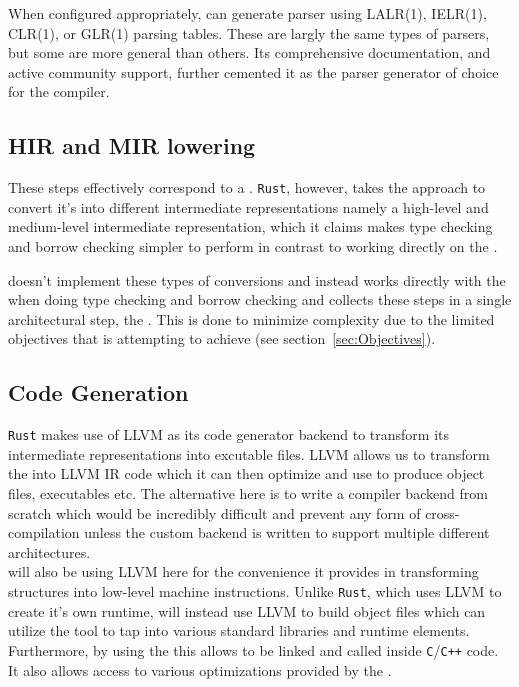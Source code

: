 When configured appropriately, \parserGen{} can generate parser using LALR(1),
IELR(1), CLR(1), or GLR(1) parsing tables. These are largly the
same types of parsers, but some are more general than others. Its comprehensive
documentation, and active community support, further cemented it as the
parser generator of choice for the \lang{} compiler.

\subsection{HIR and MIR lowering}
\label{sec:hirmir}

These steps effectively correspond to a \static{}. \texttt{Rust}, however, takes the approach
to convert it's \ast{} into different intermediate representations namely a
high-level and medium-level intermediate representation, which it claims makes type
checking and borrow checking simpler to perform in contrast to working directly on
the \ast.

\lang{} doesn't implement these types of conversions and instead works directly with
the \ast{} when doing type checking and borrow checking and collects these steps in a
single architectural step, the \static. This is done to minimize complexity due to
the limited objectives that \lang{} is attempting to achieve (see
section~\ref{sec:Objectives}).

\subsection{Code Generation}
\label{sec:codeGenTech}

\texttt{Rust} makes use of LLVM as its code generator backend to transform its intermediate
representations into excutable files. LLVM allows us to transform the \ast{} into
LLVM IR code which it can then optimize and use to produce object files, executables
etc. The alternative here is to write a compiler backend from scratch which would be
incredibly difficult and prevent any form of cross-compilation unless the custom
backend is written to support multiple different architectures. \\

\lang{} will also be using LLVM here for the convenience it provides in transforming
\ast{} structures into low-level machine instructions. Unlike \texttt{Rust}, which uses LLVM
to create it's own runtime, \lang{} will instead use LLVM to build object files which
can utilize the \gcc{} tool to tap into various standard libraries and
runtime elements. Furthermore, by using the \gcc{} this allows \lang{} to be linked and
called inside \texttt{C}/\texttt{C++} code. It also allows \lang{} access to various
optimizations provided by the \gcc.

\newpage
